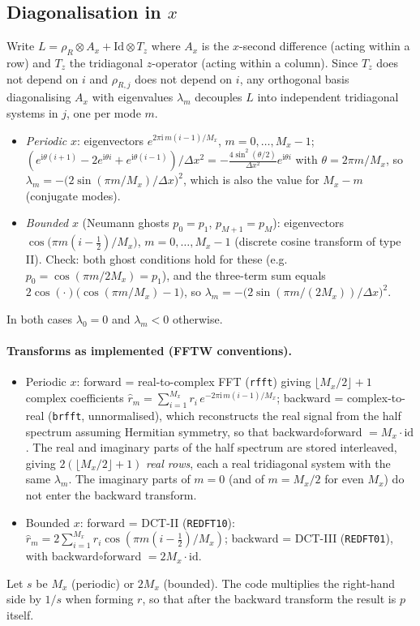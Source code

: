 \documentclass[11pt,a4paper]{article}
\newcommand{\code}[1]{\texttt{#1}}
\begin{document}
\subsection{Diagonalisation in $x$}
Write $L=\rho_R\otimes A_x+\mathrm{Id}\otimes T_z$ where $A_x$ is the $x$-second difference (acting within a row) and $T_z$ the tridiagonal $z$-operator (acting within a column). Since $T_z$ does not depend on $i$ and $\rho_{R,j}$ does not depend on $i$,
any orthogonal basis diagonalising $A_x$ with eigenvalues $\lambda_m$ decouples $L$ into independent tridiagonal systems in $j$, one per mode $m$.
\begin{itemize}
  \item \emph{Periodic} $x$: eigenvectors $e^{2\pi\mathrm i\,m(i-1)/M_x}$, $m=0,\dots,M_x-1$; $(e^{\mathrm i\theta(i+1)}-2e^{\mathrm i\theta i}+e^{\mathrm i\theta(i-1)})/\Delta x^2=-\frac{4\sin^2(\theta/2)}{\Delta x^2}e^{\mathrm i\theta i}$ with $\theta=2\pi m/M_x$,
        so $\lambda_m=-\big(2\sin(\pi m/M_x)/\Delta x\big)^2$, which is also the value for $M_x-m$ (conjugate modes).
  \item \emph{Bounded} $x$ (Neumann ghosts $p_0=p_1$, $p_{M+1}=p_M$): eigenvectors $\cos\!\big(\pi m(i-\tfrac12)/M_x\big)$, $m=0,\dots,M_x-1$ (discrete cosine transform of type II). Check: both ghost conditions hold for these (e.g.\ $p_0=\cos(\pi m/2M_x)=p_1$), and the three-term sum equals
        $2\cos(\cdot)\big(\cos(\pi m/M_x)-1\big)$, so $\lambda_m=-\big(2\sin(\pi m/(2M_x))/\Delta x\big)^2$.
\end{itemize}
In both cases $\lambda_0=0$ and $\lambda_m<0$ otherwise.

\paragraph{Transforms as implemented (FFTW conventions).}
\begin{itemize}
  \item Periodic $x$: forward = real-to-complex FFT (\code{rfft}) giving $\lfloor M_x/2\rfloor+1$ complex coefficients $\hat r_m=\sum_{i=1}^{M_x}r_i\,e^{-2\pi\mathrm i\,m(i-1)/M_x}$; backward = complex-to-real (\code{brfft}, unnormalised), which reconstructs the real signal from the half spectrum assuming Hermitian symmetry,
        so that backward$\circ$forward $=M_x\cdot\mathrm{id}$. The real and imaginary parts of the half spectrum are stored interleaved, giving $2(\lfloor M_x/2\rfloor+1)$ \emph{real rows}, each a real tridiagonal system with the same $\lambda_m$. The imaginary parts of $m=0$ (and of $m=M_x/2$ for even $M_x$) do not enter the backward transform.
  \item Bounded $x$: forward = DCT-II (\code{REDFT10}): $\hat r_m=2\sum_{i=1}^{M_x}r_i\cos(\pi m(i-\tfrac12)/M_x)$; backward = DCT-III (\code{REDFT01}), with backward$\circ$forward $=2M_x\cdot\mathrm{id}$.
\end{itemize}
Let $s$ be $M_x$ (periodic) or $2M_x$ (bounded). The code multiplies the right-hand side by $1/s$ when forming $r$, so that after the backward transform the result is $p$ itself.
\end{document}
